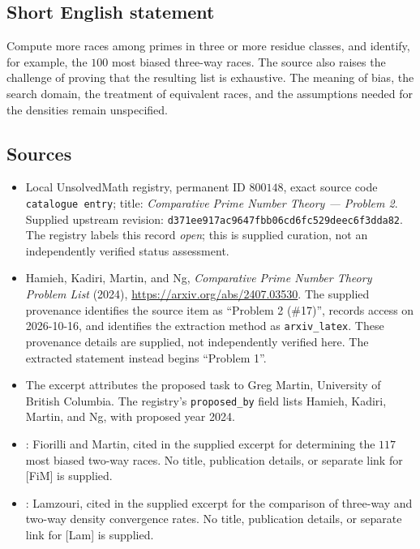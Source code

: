 \documentclass[11pt]{article}
\begin{document}
\subsection{Short English statement}
Compute more races among primes in three or more residue classes, and identify, for example, the \(100\) most biased three-way races. The source also raises the challenge of proving that the resulting list is exhaustive. The meaning of bias, the search domain, the treatment of equivalent races, and the assumptions needed for the densities remain unspecified.
\subsection{Sources}
\begin{itemize}
\item Local UnsolvedMath registry, permanent ID \(800148\), exact source code \texttt{catalogue entry}; title: \emph{Comparative Prime Number Theory --- Problem 2}. Supplied upstream revision: \texttt{d371ee917ac9647fbb06cd6fc529deec6f3dda82}. The registry labels this record \emph{open}; this is supplied curation, not an independently verified status assessment.
\item Hamieh, Kadiri, Martin, and Ng, \emph{Comparative Prime Number Theory Problem List} (2024), \url{https://arxiv.org/abs/2407.03530}. The supplied provenance identifies the source item as ``Problem 2 (\#17)'', records access on 2026-10-16, and identifies the extraction method as \texttt{arxiv\_latex}. These provenance details are supplied, not independently verified here. The extracted statement instead begins ``Problem 1''.
\item The excerpt attributes the proposed task to Greg Martin, University of British Columbia. The registry's \texttt{proposed\_by} field lists Hamieh, Kadiri, Martin, and Ng, with proposed year 2024.
\item [FiM]: Fiorilli and Martin, cited in the supplied excerpt for determining the \(117\) most biased two-way races. No title, publication details, or separate link for [FiM] is supplied.
\item [Lam]: Lamzouri, cited in the supplied excerpt for the comparison of three-way and two-way density convergence rates. No title, publication details, or separate link for [Lam] is supplied.
\end{itemize}
\end{document}
